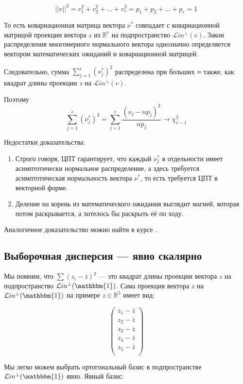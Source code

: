 \documentclass[11pt,russian,]{article}
\newcommand{\RR}{\mathbb{R}}
\newcommand{\1}{\mathbbm{1}}
\newcommand{\Lin}{\mathcal{L}in}
\newcommand{\Linp}{\Lin^{\perp}}
\begin{document}
\[
||v||^2 = v_1^2 + v_2^2 + \ldots + v_r^2 = p_1 + p_2 + \ldots + p_r = 1
\]

То есть ковариационная матрица вектора \(\nu^*\) совпадает с
ковариационной матрицой проекции вектора \(z\) из \(\RR^r\) на
подпространство \(\Linp(v)\). Закон распределения многомерного
нормального вектора однозначно определяется вектором математических
ожиданий и ковариационной матрицей.

Следовательно, сумма \(\sum_{j=1}^r (\nu_j^*)^2\) распределена при
больших \(n\) также, как квадрат длины проекции \(z\) на \(\Linp(v)\).

Поэтому \[
\sum_{j=1}^r (\nu_j^*)^2 = \sum_{j=1}^r \frac{(\nu_j - np_j)^2}{np_j} \to \chi^2_{r-1}
\]

Недостатки доказательства:

\begin{enumerate}
\def\labelenumi{\arabic{enumi}.}
\item
  Строго говоря, ЦПТ гарантирует, что каждый \(\nu_j^*\) в отдельности
  имеет асимптотически нормальное распределение, а здесь требуется
  асимптотическая нормальность вектора \(\nu^*\), то есть требуется ЦПТ
  в векторной форме.
\item
  Деление на корень из математического ожидания выглядит магией, которая
  потом раскрывается, а хотелось бы раскрыть её по ходу.
\end{enumerate}

Аналогичное доказательство можно найти в курсе
\textcite{panchenko2005statistics}.

\subsection{Выборочная дисперсия --- явно скалярно}\label{---}

Мы помним, что \(\sum (z_i - \bar z)^2\) --- это квадрат длины проекции
вектора \(z\) на подпространство \(\Linp (\1)\). Сама проекция вектора
\(z\) на \(\Linp (\1)\) на примере \(z \in \RR^{5}\) имеет вид:

\[
\begin{pmatrix}
z_1 - \bar z \\
z_2 - \bar z \\
z_3 - \bar z \\
z_4 - \bar z \\
z_5 - \bar z \\
\end{pmatrix} 
\]

Мы легко можем выбрать ортогональный базис в подпространстве
\(\Linp (\1)\) явно. Явный базис:
\end{document}
